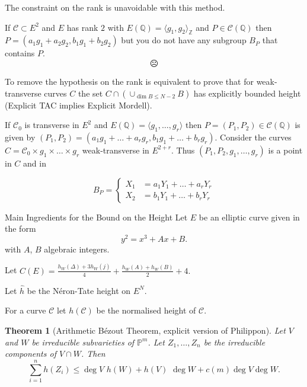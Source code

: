 \documentclass[12pt]{beamer}
\newcommand{\qe}{\mathbb{Q}}
\newcommand{\Ci}{\mathcal{C}}
\newtheorem{thm}{Theorem}
\begin{document}
\begin{frame}




\begin{alertblock}{The constraint on the rank is unavoidable with this method.}

If $\Ci\subset E^2$ and $E$ has  rank $2$ with $E(\qe)=\langle g_1, g_2\rangle_\mathbb{Z}$ and  $P\in \Ci(\qe)$ then $P=(a_1g_1+a_2g_2, b_1g_1+b_2g_2)$ but you do not have any subgroup $B_P$ that contains $P$. {\Huge $${\frownie}$$}

To remove the hypothesis on the rank is equivalent to prove that for weak-transverse curves $C$ the set $C \cap \left( \cup_{\dim B\le N-2} B \right)$ has  explicitly bounded height (Explicit TAC implies Explicit Mordell).

If $\Ci_0$ is transverse in $E^2$ and $E(\qe)=\langle g_1,\dots, g_r\rangle $ then $P=(P_1,P_2)\in \Ci(\qe) $ is given by $(P_1,P_2)=(a_1g_1+\dots +a_r g_r, b_1g_1+\dots +b_rg_r)$. Consider the curves $C=\Ci_0\times g_1 \times \dots \times g_r $ weak-transverse in $E^{2+r}$.   Thus $(P_1,P_2, g_1,\dots,g_r)$ is a point in  $C$ and in 

$$B_P=\begin{cases}X_1&=a_1 Y_1+\dots +a_rY_r\\X_2&=b_1 Y_1+\dots +b_rY_r
\end{cases} $$

\end{alertblock}


\end{frame}



\begin{frame}{Main Ingredients for the  Bound on the  Height}
Let $E$ be an elliptic curve  given in the form
\begin{equation*}\label{uno}y^2=x^3+Ax+B.\end{equation*}
with $A$, $B$ algebraic integers.

Let $C(E)=\frac{h_W(\Delta)+3h_W(j)}{4}+\frac{h_W(A)+h_W(B)}{2}+4.$

Let  $\hat{h}$ be the N\'eron-Tate height  on $E^N$. 

 For a curve $\Ci$ let $h(\Ci)$ be the normalised height of $\Ci$.
 \pause
 
\begin{thm}[Arithmetic B\'ezout Theorem, explicit version of Philippon] Let $V$ and $W$ be irreducible subvarieties of $\mathbb{P}^m$. Let $Z_1, \dots , Z_n$ be the irreducible components of $V\cap W$. Then 
$$ \sum_{i=1}^n h(Z_i)\le\deg V \,\,h(W) +h(V) \,\, \deg  W +c(m) \deg V\deg W.$$
\end{thm}
\end{frame}
\end{document}
